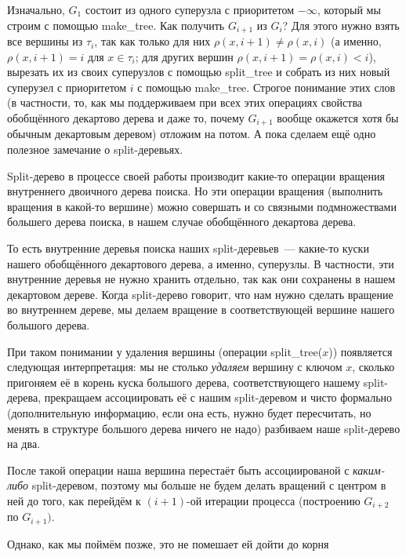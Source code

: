 Изначально, $G_1$ состоит из одного суперузла с приоритетом $-\infty$, который мы строим с помощью \textrm{make\_tree}. 
Как получить $G_{i+1}$ из $G_i$? Для этого нужно взять все
вершины из $\tau_i$, так как только для них $\rho(x, i+1) \neq \rho(x,i)$ (а именно, $\rho(x, i + 1) = i$ для $x \in \tau_i$; для других вершин $\rho(x, i + 1) = \rho(x, i) < i$), 
вырезать их из своих суперузлов с помощью \textrm{split\_tree} и собрать из них новый суперузел с приоритетом $i$ с помощью \textrm{make\_tree}. Строгое понимание этих слов (в частности, то, как мы поддерживаем при всех этих операциях свойства обобщённого декартово дерева и даже то, почему $G_{i+1}$ вообще окажется хотя бы обычным декартовым деревом) отложим на потом. А пока сделаем ещё одно полезное замечание о split-деревьях.

\begin{remark} 
Split-дерево в процессе своей работы производит какие-то операции вращения внутреннего двоичного дерева поиска. Но эти операции вращения (выполнить вращения в какой-то вершине) можно совершать и со связными подмножествами большего дерева поиска, в нашем случае обобщённого декартова дерева.

То есть внутренние деревья поиска наших split-деревьев~--- какие-то куски нашего
обобщённого декартового дерева, а именно, суперузлы. В частности, эти внутренние
деревья не нужно хранить отдельно, так как они сохранены в нашем декартовом дереве.
Когда split-дерево говорит, что нам нужно сделать вращение во внутреннем дереве, мы делаем вращение в соответствующей вершине нашего большого дерева.

При таком понимании у удаления вершины (операции \textrm{split\_tree}($x$)) появляется
следующая интерпретация: мы не столько \emph{удаляем} вершину с ключом $x$, сколько пригоняем её в корень куска большого дерева, соответствующего нашему split-дерева, прекращаем ассоциировать её с нашим split-деревом и чисто формально (дополнительную информацию, если она есть, нужно будет пересчитать, но менять в структуре большого дерева ничего не надо) разбиваем наше split-дерево на два. 

После такой операции наша вершина перестаёт быть ассоциированой с \emph{каким-либо} split-деревом, поэтому мы больше не будем делать вращений с центром в ней до того, как перейдём к $(i+1)$-ой итерации процесса (построению $G_{i+2}$ по $G_{i+1})$. 

Однако, как мы поймём позже, это не помешает ей дойти до корня
\end{remark}

